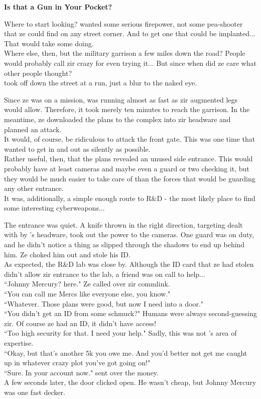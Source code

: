 \textbf{Is that a Gun in Your Pocket?}

Where to start looking? \protagonist{} wanted some serious firepower, not some pea-shooter that ze could find on any street corner. And to get one that could be implanted... That would take some doing.\\
Where else, then, but the military garrison a few miles down the road? People would probably call zir crazy for even trying it... But since when did ze care what other people thought?\\
\protagonist{} took off down the street at a run, just a blur to the naked eye.

Since ze was on a mission, \protagonist{} was running almost as fast as zir augmented legs would allow. Therefore, it took merely ten minutes to reach the garrison. In the meantime, ze downloaded the plans to the complex into zir headware and planned an attack.\\
It would, of course, be ridiculous to attack the front gate. This was one time that \protagonist{} wanted to get in and out as silently as possible.\\
Rather useful, then, that the plans revealed an unused side entrance. This would probably have at least cameras and maybe even a guard or two checking it, but they would be much easier to take care of than the forces that would be guarding any other entrance.\\
It was, additionally, a simple enough route to R\&D - the most likely place to find some interesting cyberweapons...

The entrance was quiet. A knife thrown in the right direction, targeting dealt with by \protagonist{}'s headware, took out the power to the cameras. One guard was on duty, and he didn't notice a thing as \protagonist{} slipped through the shadows to end up behind him. Ze choked him out and stole his ID.\\
As expected, the R\&D lab was close by. Although the ID card that ze had stolen didn't allow zir entrance to the lab, a friend was on call to help...\\
``Johnny Mercury? \protagonist{} here." Ze called over zir commlink.\\
``You can call me Mercs like everyone else, you know."\\
``Whatever. Those plans were good, but now I need into a door."\\
``You didn't get an ID from some schmuck?" Humans were always second-guessing zir. Of course ze had an ID, it didn't have access!\\
``Too high security for that. I need your help." Sadly, this was not \protagonist{}'s area of expertise.\\
``Okay, but that's another 5k you owe me. And you'd better not get me caught up in whatever crazy plot you've got going on!"\\
``Sure. In your account now." \protagonist{} sent over the money.\\
A few seconds later, the door clicked open. He wasn't cheap, but Johnny Mercury was one fast decker.

